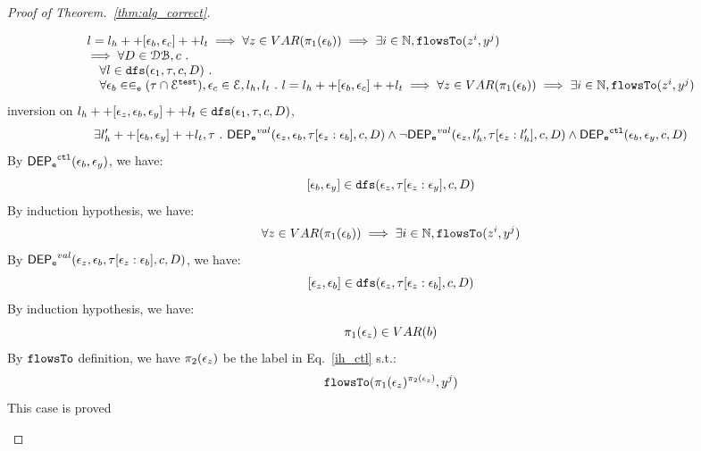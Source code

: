 \begin{proof}[Proof of Theorem.~\ref{thm:alg_correct}]
\begin{case}
\begin{subcase}
\[\begin{array}{l}
   l = l_h ++ [ \mathtt{\epsilon}_b, \mathtt{\epsilon}_c] ++ l_t 
   \implies \forall z \in VAR(\pi_1(\mathtt{\epsilon}_b)) \implies \exists i \in \mathbb{N}, \mathtt{flowsTo}(z^i, y^j)
   \\
   \implies
   \forall D \in \mathcal{DB} , c ~.~
  \\ \quad 
   \forall l \in \mathtt{dfs}(\mathtt{\epsilon}_1, \mathtt{\tau}, c, D) ~.~
   \\ \quad 
   \forall \mathtt{\epsilon}_b \in \in_{\mathtt{e}} (\mathtt{\tau} \cap \mathcal{E}^{\mathtt{{test}}}), \mathtt{\epsilon}_c \in \mathcal{E}, l_h, l_t ~.~ 
   l = l_h ++ [ \mathtt{\epsilon}_b, \mathtt{\epsilon}_c] ++ l_t 
   \implies \forall z \in VAR(\pi_1(\mathtt{\epsilon}_b)) \implies \exists i \in \mathbb{N}, \mathtt{flowsTo}(z^i, y^j)
\end{array}
\]
inversion on  $l_h ++ {[\mathtt{\epsilon}_z,  \mathtt{\epsilon}_b, \mathtt{\epsilon}_y]} ++ l_t \in \mathtt{dfs}(\mathtt{\epsilon}_1, \mathtt{\tau}, c, D)$, 
\[
  \exists l_{h}' ++ [\mathtt{\epsilon}_b, \mathtt{\epsilon}_y] ++ l_t, \mathtt{\tau} ~.~
  \mathsf{DEP_{\mathtt{e}}}^{val}(\mathtt{\epsilon}_z, \mathtt{\epsilon}_b, \mathtt{\tau}[\mathtt{\epsilon}_z: \mathtt{\epsilon}_b], c, D)
  \land 
  \neg \mathsf{DEP_{\mathtt{e}}}^{val} (\mathtt{\epsilon}_z, l_h', \mathtt{\tau}[\mathtt{\epsilon}_z: l_h'], c, D)
  \land 
  \mathsf{DEP_{\mathtt{e}}}^{\mathtt{{ctl}}} (\mathtt{\epsilon}_b, \mathtt{\epsilon}_y, c, D)
\]
%
By $\mathsf{DEP_{\mathtt{e}}}^{\mathtt{{ctl}}} (\mathtt{\epsilon}_b, \mathtt{\epsilon}_y) $, we have:
\[
  [\mathtt{\epsilon}_b, \mathtt{\epsilon}_y]\in \mathtt{dfs}(\mathtt{\epsilon}_{z}, \mathtt{\tau}[\mathtt{\epsilon}_{z}:\mathtt{\epsilon}_{y}], c, D)
\]
%
By induction hypothesis, we have:
\begin{equation}
\label{ih_ctl}
  \forall z \in VAR(\pi_1(\mathtt{\epsilon}_b)) \implies \exists i \in \mathbb{N}, \mathtt{flowsTo}(z^i, y^j)
\end{equation}
%
By $\mathsf{DEP_{\mathtt{e}}}^{val}(\mathtt{\epsilon}_z, \mathtt{\epsilon}_b, \mathtt{\tau}[\mathtt{\epsilon}_z: \mathtt{\epsilon}_b], c, D)$, we have:
\[
  [\mathtt{\epsilon}_z, \mathtt{\epsilon}_b]\in \mathtt{dfs}(\mathtt{\epsilon}_{z}, \mathtt{\tau}[\mathtt{\epsilon}_{z}:\mathtt{\epsilon}_{b}], c, D)
\]
%
By induction hypothesis, we have:
\[
  \pi_1(\mathtt{\epsilon}_z) \in VAR(b)
\]
%
By $\mathtt{flowsTo}$ definition, we have $\pi_2(\mathtt{\epsilon}_z)$ be the label in Eq.~\ref{ih_ctl} s.t.:
\[
  \mathtt{flowsTo}(\pi_1(\mathtt{\epsilon}_z)^{\pi_2(\mathtt{\epsilon}_z)}, y^j)
\]
%
This case is proved
%
%
\end{subcase}

\end{case}
\end{proof}
